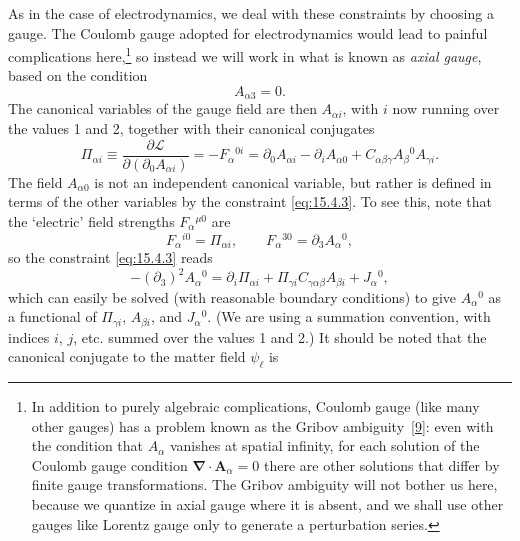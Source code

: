As in the case of electrodynamics, we deal with these constraints by choosing
a gauge. The Coulomb gauge adopted for electrodynamics would lead to painful
complications here,\footnote{In addition to purely algebraic complications,
Coulomb gauge (like many other gauges) has a problem known as the Gribov
ambiguity~\hyperref[ch15-ref-9]{[9]}: even with the condition that $A_\alpha$
vanishes at spatial infinity, for each solution of the Coulomb gauge condition
$\boldsymbol\nabla\cdot\mathbf A_\alpha=0$ there are other solutions that differ
by finite gauge transformations. The Gribov ambiguity will not bother us here,
because we quantize in axial gauge where it is absent, and we shall use other
gauges like Lorentz gauge only to generate a perturbation series.} so instead
we will work in what is known as \emph{axial gauge}, based on the condition
\begin{equation}
  A_{\alpha3}=0.
  \tag{15.4.4}\label{eq:15.4.4}
\end{equation}
The canonical variables of the gauge field are then $A_{\alpha i}$, with $i$
now running over the values 1 and 2, together with their canonical conjugates
\begin{equation}
  \Pi_{\alpha i}\equiv\frac{\partial\mathcal L}
  {\partial(\partial_0A_{\alpha i})}=-F_\alpha{}^{0i}
  =\partial_0A_{\alpha i}-\partial_iA_{\alpha0}
  +C_{\alpha\beta\gamma}A_\beta{}^0A_{\gamma i}.
  \tag{15.4.5}\label{eq:15.4.5}
\end{equation}
The field $A_{\alpha0}$ is not an independent canonical variable, but rather
is defined in terms of the other variables by the constraint \eqref{eq:15.4.3}.
To see this, note that the `electric' field strengths $F_\alpha{}^{\mu0}$ are
\begin{equation}
  F_\alpha{}^{i0}=\Pi_{\alpha i},
  \qquad F_\alpha{}^{30}=\partial_3A_\alpha{}^0,
  \tag{15.4.6}\label{eq:15.4.6}
\end{equation}
so the constraint \eqref{eq:15.4.3} reads
\begin{equation}
  -(\partial_3)^2A_\alpha{}^0
  =\partial_i\Pi_{\alpha i}
  +\Pi_{\gamma i}C_{\gamma\alpha\beta}A_{\beta i}+J_\alpha{}^0,
  \tag{15.4.7}\label{eq:15.4.7}
\end{equation}
which can easily be solved (with reasonable boundary conditions) to give
$A_\alpha{}^0$ as a functional of $\Pi_{\gamma i}$, $A_{\beta i}$, and
$J_\alpha{}^0$. (We are using a summation convention, with indices $i$, $j$,
etc. summed over the values 1 and 2.) It should be noted that the canonical
conjugate to the matter field $\psi_\ell$ is
